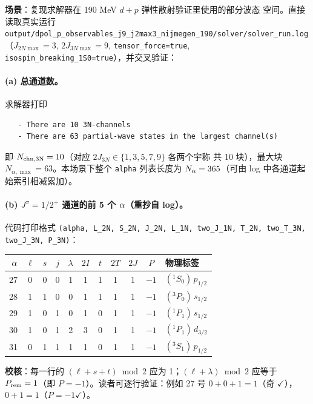 \begin{numericalbox}[label={box:ch03-numerical-closure}]
\textbf{场景}：复现求解器在 190 MeV \(d+p\) 弹性散射验证里使用的部分波态
空间。直接读取真实运行 \texttt{output/dpol\_p\_observables\_j9\_j2max3\_nijmegen\_190/solver/solver\_run.log}
（\(J_{2N\max} = 3\), \(2J_{3N\max} = 9\), \texttt{tensor\_force=true},
\texttt{isospin\_breaking\_1S0=true}），并交叉验证：

\paragraph{(a) 总通道数。}
求解器打印
\begin{verbatim}
   - There are 10 3N-channels
   - There are 63 partial-wave states in the largest channel(s)
\end{verbatim}
即 \(N_{\rm chn,3N} = 10\)（对应 \(2J_{3N} \in \{1,3,5,7,9\}\) 各两个宇称
共 10 块），最大块 \(N_{\alpha,\max} = 63\)。本场景下整个 \texttt{alpha}
列表长度为 \(N_\alpha = 365\)（可由 log 中各通道起始索引相减累加）。

\paragraph{(b) \(J^\pi = 1/2^+\) 通道的前 5 个 \(\alpha\)（重抄自 log）。}
代码打印格式 \texttt{(alpha, L\_2N, S\_2N, J\_2N, L\_1N, two\_J\_1N, T\_2N,
two\_T\_3N, two\_J\_3N, P\_3N)}：

\begin{center}
\begin{tabular}{rcccccccccl}
\toprule
\(\alpha\) & \(\ell\) & \(s\) & \(j\) & \(\lambda\) & \(2I\) & \(t\) & \(2T\) & \(2J\) & \(P\) & 物理标签 \\
\midrule
27 & 0 & 0 & 0 & 1 & 1 & 1 & 1 & 1 & \(-1\) & \(({}^1S_0)\,p_{1/2}\) \\
28 & 1 & 1 & 0 & 0 & 1 & 1 & 1 & 1 & \(-1\) & \(({}^3P_0)\,s_{1/2}\) \\
29 & 1 & 0 & 1 & 0 & 1 & 0 & 1 & 1 & \(-1\) & \(({}^1P_1)\,s_{1/2}\) \\
30 & 1 & 0 & 1 & 2 & 3 & 0 & 1 & 1 & \(-1\) & \(({}^1P_1)\,d_{3/2}\) \\
31 & 0 & 1 & 1 & 1 & 1 & 0 & 1 & 1 & \(-1\) & \(({}^3S_1)\,p_{1/2}\) \\
\bottomrule
\end{tabular}
\end{center}

\textbf{校核}：每一行的 \((\ell + s + t) \bmod 2\) 应为 1；\((\ell + \lambda) \bmod 2\)
应等于 \(P_{\rm rem} = 1\)（即 \(P = -1\)）。读者可逐行验证：例如 27 号
\(0+0+1 = 1\)（奇 \(\checkmark\)），\(0+1=1\)（\(P=-1\)\(\checkmark\)）。


\end{numericalbox}
